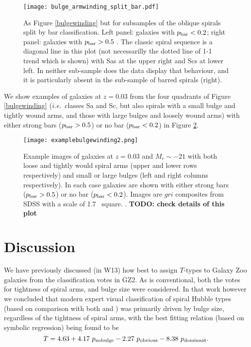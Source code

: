 \documentclass[usenatbib]{mn2e}
\newcommand{\ie}{{\it i.e.}}
\newcommand{\be}{\begin{equation}}
\newcommand{\ee}{\end{equation}}
\begin{document}
 \begin{figure*}
\texttt{[image: bulge\_armwinding\_split\_bar.pdf]}
\caption{As Figure \ref{bulgewinding} but for subsamples of the oblique spirals split by bar classification.  Left panel: galaxies with $p_{\rm bar} < 0.2$; right panel: galaxies with $p_{\rm bar} > 0.5$ \label{bars}. The classic spiral sequence is a diagonal line in this plot (not necessarilly the dotted line of 1-1 trend which is shown) with Sas at the upper right and Scs at lower left. In neither sub-sample does the data display that behaviour, and it is particularly absent in the sub-sample of barred spirals (right).}
\end{figure*}

 We show examples of galaxies at $z=0.03$ from the four quadrants of Figure \ref{bulgewinding} (\ie ~classes Sa and Sc, but also spirals with a small bulge and tightly wound arms, and those with large bulges and loosely wound arms) with either strong bars ($p_{\rm bar}>0.5$) or no bar ($p_{\rm bar} < 0.2$) in Figure \ref{windingexample}. 
 
 \begin{figure*}
\center
\texttt{[image: examplebulgewinding2.png]}
\caption{Example images of galaxies at $z=0.03$ and $M_r\sim -21$ with both loose and tightly would spiral arms (upper and lower rows respectively) and small or large bulges (left and right columns respectively). In each case galaxies are shown with either strong bars ($p_{\rm bar}>0.5$) or no bar ($p_{\rm bar} < 0.2$). Images are $gri$ composites from SDSS with a scale of 1.7\arcmin~ square.  \label{windingexample}. {\bf TODO: check details of this plot}}
\end{figure*}
 
\section{Discussion} \label{discussion}

 
 We have previously discussed (in W13) how best to assign $T$-types to Galaxy Zoo galaxies from the classification votes in GZ2. As is conventional, both the votes for tightness of spiral arms, and bulge size were considered. In that work however we concluded that modern expert visual classification of spiral Hubble types (based on comparison with both \citet[hereafter NA10]{Nair2010a} and \citet{EFIGI}) was primarily driven by bulge size, regardless of the tightness of spiral arms, with the best fitting relation (based on symbolic regression) being found to be
 \be
 T = 4.63 + 4.17~p_{\rm no bulge} - 2.27~p_{\rm obvious} - 8.38~p_{\rm dominant}. 
 \ee 
 
\end{document}
